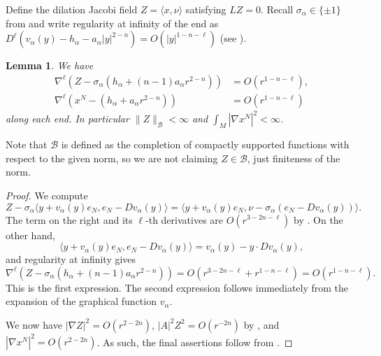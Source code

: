 \documentclass[11pt]{amsart}
\numberwithin{equation}{section}
\theoremstyle{plain}
\newtheorem{lemma}[lemma]{Lemma}
\theoremstyle{definition}
\theoremstyle{remark}
\newcommand{\Bcal}{\mathcal B}
\newcommand{\bangle}[1]{\langle #1 \rangle}
\begin{document}
Define the dilation Jacobi field $Z = \bangle{x,\nu}$ satisfying $LZ=0$. Recall $\sigma_\alpha \in \{\pm 1\}$ from  and write regularity at infinity of the end as $D^\ell(v_\alpha(y) - h_\alpha - a_\alpha|y|^{2-n}) = O(|y|^{1-n-\ell})$ (see ). 
\begin{lemma}\label{lemm:Z-est}
We have 
\begin{align*}
\nabla^\ell(Z - \sigma_\alpha ( h_\alpha + (n-1) a_\alpha r^{2-n})) & = O(r^{1-n - \ell}),\\
\nabla^\ell(x^N - (h_\alpha + a_\alpha r^{2-n})) & = O(r^{1-n-\ell})
\end{align*}
along each end. In particular $\|Z\|_\Bcal <\infty$ and $\int_M |\nabla x^N|^2 <\infty$. 
\end{lemma}
Note that $\Bcal$ is defined as the completion of compactly supported functions with respect to the given norm, so we are not claiming $Z\in\Bcal$, just finiteness of the norm.
\begin{proof}
We compute
\[
Z - \sigma_\alpha \bangle{y + v_\alpha(y) e_N,e_N- D v_\alpha(y)} = \bangle{y + v_\alpha(y) e_N,\nu - \sigma_\alpha (e_N-D v_\alpha(y))}. 
\] 
The term on the right and its $\ell$-th derivatives are $O(r^{3-2n-\ell})$ by . On the other hand,
\[
\bangle{y + v_\alpha(y) e_N,e_N- D v_\alpha(y)} = v_\alpha(y) - y\cdot D v_\alpha(y),
\]
and regularity at infinity gives
\[
\nabla^\ell(Z - \sigma_\alpha ( h_\alpha + (n-1) a_\alpha r^{2-n})) = O(r^{3-2n -\ell} + r^{1-n-\ell}) = O(r^{1-n-\ell}). 
\]
This is the first expression. The second expression follows immediately from the expansion of the graphical function $v_\alpha$. 

We now have $|\nabla Z|^2 = O(r^{2-2n})$, $|A|^2Z^2 = O(r^{-2n})$ by , and $|\nabla x^N|^2 = O(r^{2-2n})$. As such, the final assertions follow from  .
\end{proof}
\end{document}
